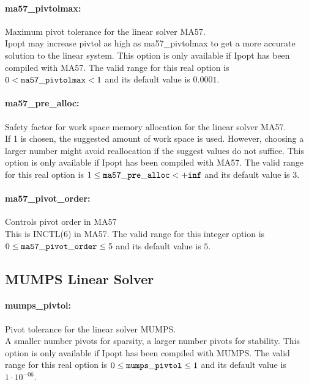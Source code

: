 \paragraph{ma57\_pivtolmax:}\label{sec:ma57_pivtolmax} Maximum pivot tolerance for the linear solver MA57. $\;$ \\
 Ipopt may increase pivtol as high as
ma57\_pivtolmax to get a more accurate solution
to the linear system.  This option is only
available if Ipopt has been compiled with MA57. The valid range for this real option is 
$0 <  {\tt ma57\_pivtolmax } <  1$
and its default value is $0.0001$.


\paragraph{ma57\_pre\_alloc:}\label{sec:ma57_pre_alloc} Safety factor for work space memory allocation for the linear solver MA57. $\;$ \\
 If 1 is chosen, the suggested amount of work
space is used.  However, choosing a larger number
might avoid reallocation if the suggest values do
not suffice.  This option is only available if
Ipopt has been compiled with MA57. The valid range for this real option is 
$1 \le {\tt ma57\_pre\_alloc } <  {\tt +inf}$
and its default value is $3$.


\paragraph{ma57\_pivot\_order:}\label{sec:ma57_pivot_order} Controls pivot order in MA57 $\;$ \\
 This is INCTL(6) in MA57. The valid range for this integer option is
$0 \le {\tt ma57\_pivot\_order } \le 5$
and its default value is $5$.


\subsection{MUMPS Linear Solver}

\paragraph{mumps\_pivtol:}\label{sec:mumps_pivtol} Pivot tolerance for the linear solver MUMPS. $\;$ \\
 A smaller number pivots for sparsity, a larger
number pivots for stability.  This option is only
available if Ipopt has been compiled with MUMPS. The valid range for this real option is 
$0 \le {\tt mumps\_pivtol } \le 1$
and its default value is $1 \cdot 10^{-06}$.


